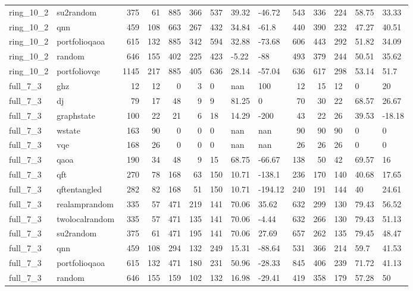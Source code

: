 \begin{longtable}{llrrrrlllrrlll}
ring\_10\_2 & su2random & 375 & 61 & 885 & 366 & 537 & 39.32 & -46.72 & 543 & 336 & 224 & 58.75 & 33.33 \\
ring\_10\_2 & qnn & 459 & 108 & 663 & 267 & 432 & 34.84 & -61.8 & 440 & 390 & 232 & 47.27 & 40.51 \\
ring\_10\_2 & portfolioqaoa & 615 & 132 & 885 & 342 & 594 & 32.88 & -73.68 & 606 & 443 & 292 & 51.82 & 34.09 \\
ring\_10\_2 & random & 646 & 155 & 402 & 225 & 423 & -5.22 & -88 & 493 & 379 & 244 & 50.51 & 35.62 \\
ring\_10\_2 & portfoliovqe & 1145 & 217 & 885 & 405 & 636 & 28.14 & -57.04 & 636 & 617 & 298 & 53.14 & 51.7 \\
full\_7\_3 & ghz & 12 & 12 & 0 & 3 & 0 & nan & 100 & 12 & 15 & 12 & 0 & 20 \\
full\_7\_3 & dj & 79 & 17 & 48 & 9 & 9 & 81.25 & 0 & 70 & 30 & 22 & 68.57 & 26.67 \\
full\_7\_3 & graphstate & 100 & 22 & 21 & 6 & 18 & 14.29 & -200 & 43 & 22 & 26 & 39.53 & -18.18 \\
full\_7\_3 & wstate & 163 & 90 & 0 & 0 & 0 & nan & nan & 90 & 90 & 90 & 0 & 0 \\
full\_7\_3 & vqe & 168 & 26 & 0 & 0 & 0 & nan & nan & 26 & 26 & 26 & 0 & 0 \\
full\_7\_3 & qaoa & 190 & 34 & 48 & 9 & 15 & 68.75 & -66.67 & 138 & 50 & 42 & 69.57 & 16 \\
full\_7\_3 & qft & 270 & 78 & 168 & 63 & 150 & 10.71 & -138.1 & 236 & 170 & 140 & 40.68 & 17.65 \\
full\_7\_3 & qftentangled & 282 & 82 & 168 & 51 & 150 & 10.71 & -194.12 & 240 & 191 & 144 & 40 & 24.61 \\
full\_7\_3 & realamprandom & 335 & 57 & 471 & 219 & 141 & 70.06 & 35.62 & 632 & 299 & 130 & 79.43 & 56.52 \\
full\_7\_3 & twolocalrandom & 335 & 57 & 471 & 135 & 141 & 70.06 & -4.44 & 632 & 266 & 130 & 79.43 & 51.13 \\
full\_7\_3 & su2random & 375 & 61 & 471 & 195 & 141 & 70.06 & 27.69 & 657 & 262 & 135 & 79.45 & 48.47 \\
full\_7\_3 & qnn & 459 & 108 & 294 & 132 & 249 & 15.31 & -88.64 & 531 & 366 & 214 & 59.7 & 41.53 \\
full\_7\_3 & portfolioqaoa & 615 & 132 & 471 & 180 & 231 & 50.96 & -28.33 & 845 & 406 & 239 & 71.72 & 41.13 \\
full\_7\_3 & random & 646 & 155 & 159 & 102 & 132 & 16.98 & -29.41 & 419 & 358 & 179 & 57.28 & 50 \\

\end{longtable}
